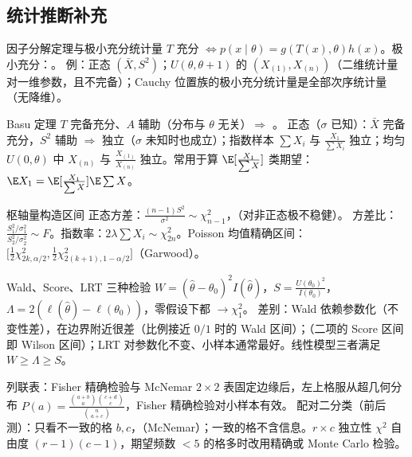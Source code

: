 \subsection{统计推断补充}

\begin{结论}{因子分解定理与极小充分统计量}
$T$ 充分 $\iff p(x\mid\theta)=g(T(x),\theta)h(x)$。极小充分：。
例：正态 $(\bar X,S^2)$；$U(\theta,\theta+1)$ 的 $(X_{(1)},X_{(n)})$（二维统计量对一维参数，且不完备）；Cauchy 位置族的极小充分统计量是全部次序统计量（无降维）。
\end{结论}

\begin{结论}{Basu 定理}
$T$ 完备充分、$A$ 辅助（分布与 $\theta$ 无关）$\Rightarrow$ 。
正态（$\sigma$ 已知）：$\bar X$ 完备充分，$S^2$ 辅助 $\Rightarrow$ 独立（$\sigma$ 未知时也成立）；指数样本 $\sum X_i$ 与 $\frac{X_1}{\sum X_i}$ 独立；均匀 $U(0,\theta)$ 中 $X_{(n)}$ 与 $\frac{X_{(1)}}{X_{(n)}}$ 独立。常用于算 $\E[\frac{X_1}{\sum X}]$ 类期望：$\E X_1=\E[\frac{X_1}{\sum X}]\E\sum X$。
\end{结论}

\begin{结论}{枢轴量构造区间}
正态方差：$\frac{(n-1)S^2}{\sigma^2}\sim\chi^2_{n-1}$，（对非正态极不稳健）。
方差比：$\frac{S_1^2/\sigma_1^2}{S_2^2/\sigma_2^2}\sim F$。指数率：$2\lambda\sum X_i\sim\chi^2_{2n}$。Poisson 均值精确区间：$\bigl[\frac12\chi^2_{2k,\alpha/2},\frac12\chi^2_{2(k+1),1-\alpha/2}\bigr]$（Garwood）。
\end{结论}

\begin{结论}{Wald、Score、LRT 三种检验}
$W=(\hat\theta-\theta_0)^2I(\hat\theta)$，$S=\frac{U(\theta_0)^2}{I(\theta_0)}$，$\Lambda=2(\ell(\hat\theta)-\ell(\theta_0))$，零假设下都 $\to\chi^2_1$。
差别：Wald 依赖参数化（不变性差），在边界附近很差（比例接近 $0/1$ 时的 Wald 区间）；（二项的 Score 区间即 Wilson 区间）；LRT 对参数化不变、小样本通常最好。线性模型三者满足 $W\ge\Lambda\ge S$。
\end{结论}

\begin{结论}{列联表：Fisher 精确检验与 McNemar}
$2\times2$ 表固定边缘后，左上格服从超几何分布 $P(a)=\frac{\binom{a+b}{a}\binom{c+d}{c}}{\binom{n}{a+c}}$，Fisher 精确检验对小样本有效。
配对二分类（前后测）：只看不一致的格 $b,c$，（McNemar）；一致的格不含信息。$r\times c$ 独立性 $\chi^2$ 自由度 $(r-1)(c-1)$，期望频数 $<5$ 的格多时改用精确或 Monte Carlo 检验。
\end{结论}

